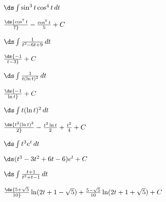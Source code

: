 \begin{enumialphparenastyle}
\begin{ex}	%
 $\ds\int \sin^3 t\cos^4 t\,dt$
\begin{sol}
 $\ds{\cos^7 t\over 7}-{\cos^5 t\over 5}+C$
\end{sol}
\end{ex}

\begin{ex}	%
 $\ds\int {1\over t^2-6t+9}\,dt$
\begin{sol}
 $\ds{-1\over t-3}+C$
\end{sol}
\end{ex}

\begin{ex}	%
 $\ds\int {1\over t(\ln t)^2}\,dt$
\begin{sol}
 $\ds{-1\over \ln t}+C$
\end{sol}
\end{ex}

\begin{ex}	%
 $\ds\int t(\ln t)^2\,dt$
\begin{sol}
 $\ds{t^2(\ln t)^2\over 2}-{t^2\ln t\over 2}+{t^2\over4}+C$
\end{sol}
\end{ex}

\begin{ex}	%
 $\ds\int t^3e^{t}\,dt$
\begin{sol}
 $\ds(t^3-3t^2+6t-6)e^t+C$
\end{sol}
\end{ex}

\begin{ex}	%
 $\ds\int {t+1\over t^2+t-1}\,dt$
\begin{sol}
 $\ds{5+\sqrt5\over10}
\ln(2t+1-\sqrt5)+{5-\sqrt5\over10}\ln(2t+1+\sqrt5)+C$
\end{sol}
\end{ex}

\end{enumialphparenastyle}